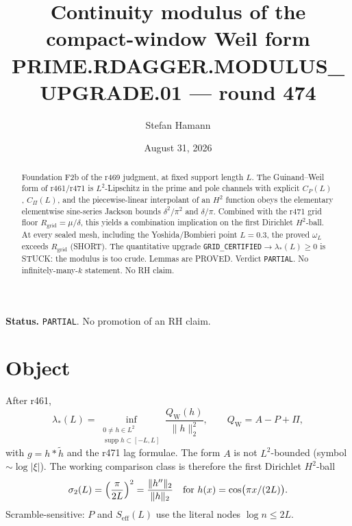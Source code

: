 \documentclass[11pt]{article}
\title{\bfseries Continuity modulus of the compact-window Weil form\\[2mm]
\large PRIME.RDAGGER.MODULUS\_UPGRADE.01 --- round 474}
\author{Stefan Hamann}
\date{August 31, 2026}
\theoremstyle{remark}
\newcommand{\QW}{Q_{\mathrm W}}
\begin{document}
\maketitle

\begin{abstract}\noindent
Foundation F2b of the r469 judgment, at fixed support length $L$.
The Guinand--Weil form of r461/r471 is $L^2$-Lipschitz in the prime
and pole channels with explicit $C_P(L)$, $C_\Pi(L)$, and the
piecewise-linear interpolant of an $H^2$ function obeys the elementary
elementwise sine-series Jackson bounds $\delta^2/\pi^2$ and
$\delta/\pi$.  Combined with the r471 grid floor
$R_{\mathrm{grid}}=\mu/\delta$, this yields a combination implication
on the first Dirichlet $H^2$-ball.  At every sealed mesh, including
the Yoshida/Bombieri point $L=0.3$, the proved $\omega_L$ exceeds
$R_{\mathrm{grid}}$ (SHORT).  The quantitative upgrade
\texttt{GRID\_CERTIFIED}$\to\lambda_*(L)\ge0$ is STUCK: the modulus is
too crude.  Lemmas are PROVED.  Verdict \texttt{PARTIAL}.
No infinitely-many-$k$ statement.  No RH claim.
\end{abstract}

\medskip\noindent
\textbf{Status.}\enspace
\texttt{PARTIAL}.  No promotion of an RH claim.

\begin{center}
\end{center}

\section{Object}

After r461,
\[
 \lambda_*(L)=
 \inf_{\substack{0\ne h\in L^2\\ \operatorname{supp}h\subset[-L,L]}}
 \frac{\QW(h)}{\|h\|_2^2},\qquad
 \QW=A-P+\Pi,
\]
with $g=h*\widetilde h$ and the r471 lag formulae.  The form $A$ is
not $L^2$-bounded (symbol $\sim\log|\xi|$).  The working comparison
class is therefore the first Dirichlet $H^2$-ball
\[
 \sigma_2(L)=\Bigl(\frac{\pi}{2L}\Bigr)^2
 =\frac{\|h''\|_2}{\|h\|_2}
 \quad\text{for }h(x)=\cos\bigl(\pi x/(2L)\bigr).
\]
Scramble-sensitive: $P$ and $S_{\mathrm{eff}}(L)$ use the literal
nodes $\log n\le 2L$.
\end{document}
